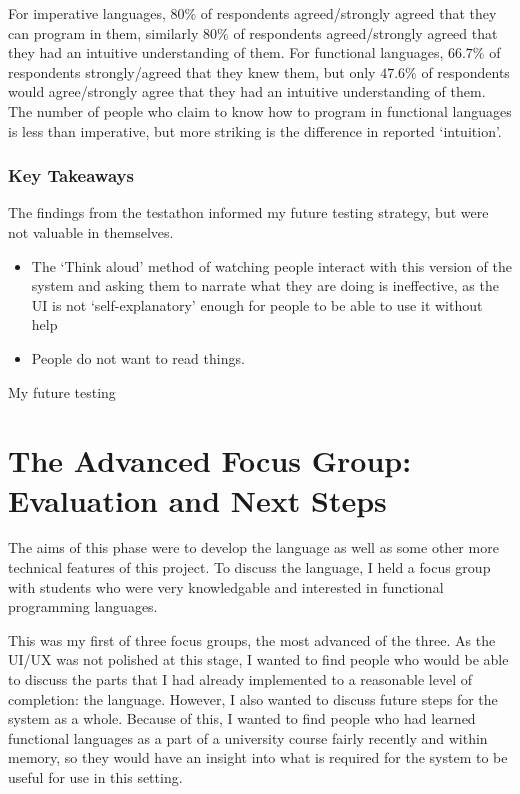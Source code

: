 For imperative languages, $80\%$ of respondents agreed/strongly agreed that they can program in them, similarly $80\%$ of respondents agreed/strongly agreed that they had an intuitive understanding of them. For functional languages, $66.7\%$ of respondents strongly/agreed that they knew them, but only $47.6\%$ of respondents would agree/strongly agree that they had an intuitive understanding of them. The number of people who claim to know how to program in functional languages is less than imperative, but more striking is the difference in reported `intuition'. 

\subsubsection{Key Takeaways} The findings from the testathon informed my future testing strategy, but were not valuable in themselves. 
\begin{itemize}
    \item The `Think aloud' method of watching people interact with this version of the system and asking them to narrate what they are doing is ineffective, as the UI is not `self-explanatory' enough for people to be able to use it without help 
    \item People do not want to read things. 
\end{itemize}

My future testing 

\section{The Advanced Focus Group: Evaluation and Next Steps}
\label{ref:afg_figma}
\label{ref:afg}
The aims of this phase were to develop the language as well as some other more technical features of this project. To discuss the language, I held a focus group with students who were very knowledgable and interested in functional programming languages. 

This was my first of three focus groups, the most advanced of the three. As the UI/UX was not polished at this stage, I wanted to find people who would be able to discuss the parts that I had already implemented to a reasonable level of completion: the language. However, I also wanted to discuss future steps for the system as a whole. Because of this, I wanted to find people who had learned functional languages as a part of a university course fairly recently and within memory, so they would have an insight into what is required for the system to be useful for use in this setting. 

